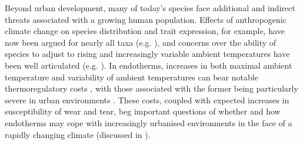 \documentclass[12pt]{article}
\begin{document}
\noindent Beyond urban development, many of today's species face additional and indirect threats associated with a growing human population. Effects of anthropogenic climate change on species distribution and trait expression, for example, have now been argued for nearly all taxa (e.g. \citealt{barton_2016,mainwaring_2017,pacifici_2017,wan_2018}), and concerns over the ability of species to adjust to rising and increasingly variable ambient temperatures \citep{vasseur_2014} have been well articulated (e.g. \citealt{duputie_2015,radchuk_2019}). In endotherms, increases in both maximal ambient temperature and variability of ambient temperatures can bear notable thermoregulatory costs \citep{pendlebury_2004,duplessis_2012,smit_2018}, with those associated with the former being particularly severe in urban environments \citep{arnfield_2003}. These costs, coupled with expected increases in susceptibility of wear and tear, beg important questions of whether and how endotherms may cope with increasingly urbanised environments in the face of a rapidly changing climate (discussed in \citealt{pautasso_2012,argueso_2015, brans_2017}). \vspace{1cm}
\end{document}
